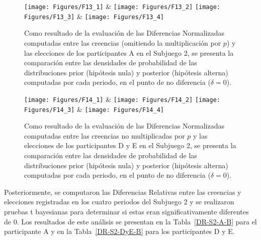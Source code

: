 \begin{figure}[hp]
\centering
\texttt{[image: Figures/F13\_1]} & \texttt{[image: Figures/F13\_2]} 
\texttt{[image: Figures/F13\_3]} & \texttt{[image: Figures/F13\_4]} 
\decoRule
\caption[Evaluación de las Diferencias Normalizadas entre creencias (sin multiplicar por $p$) y elecciones en los participantes A en el Subjuego 2 (Factor de Bayes)]{Como resultado de la evaluación de las Diferencias Normalizadas computadas entre las creencias (omitiendo la multiplicación por $p$) y las elecciones de los participantes A en el Subjuego 2, se presenta la comparación entre las densidades de probabilidad de las distribuciones prior (hipótesis nula) y posterior (hipótesis alterna) computadas por cada periodo, en el punto de no diferencia ($\delta = 0$).}
\label{fig:DNnop_S2_A}
\end{figure}  


\begin{figure}[hp]
\centering
\texttt{[image: Figures/F14\_1]} & \texttt{[image: Figures/F14\_2]} 
\texttt{[image: Figures/F14\_3]} & \texttt{[image: Figures/F14\_4]} 
\decoRule
\caption[Evaluación de las Diferencias Normalizadas entre creencias y elecciones en los participantes D y E en el Subjuego 2 (Factor de Bayes)]{Como resultado de la evaluación de las Diferencias Normalizadas computadas entre las creencias no multiplicadas por $p$ y las elecciones de los participantes D y E en el Subjuego 2, se presenta la comparación entre las densidades de probabilidad de las distribuciones prior (hipótesis nula) y posterior (hipótesis alterna) computadas por cada periodo, en el punto de no diferencia ($\delta = 0$).}
\label{fig:DNnop_S2_DyE}
\end{figure}  

Posteriormente, se computaron las Diferencias Relativas entre las creencias y elecciones registradas en los cuatro periodos del Subjuego 2 y se realizaron pruebas t bayesianas para determinar si estas eran significativamente diferentes de 0. Los resultados de este análisis se presentan en la Tabla~\ref{DR-S2-A-B} para el participante A y en la Tabla~\ref{DR-S2-DyE-B} para los participantes D y E.\\

